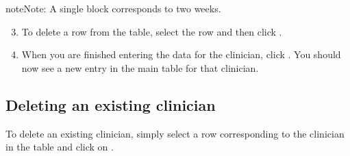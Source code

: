 \documentclass[letterpaper,10pt,english]{sphinxmanual}
\begin{document}
\begin{sphinxadmonition}{note}{Note:}
A single block corresponds to two weeks.
\end{sphinxadmonition}

\begin{figure}[htbp]
\centering
{}\end{figure}

\begin{DUlineblock}{0em}
\item[] 
\end{DUlineblock}
\begin{enumerate}
\setcounter{enumi}{2}
\item {} 
To delete a row from the table, select the row and then click .

\end{enumerate}

\begin{figure}[htbp]
\centering
{}\end{figure}

\begin{DUlineblock}{0em}
\item[] 
\end{DUlineblock}
\begin{enumerate}
\setcounter{enumi}{3}
\item {} 
When you are finished entering the data for the clinician, click .
You should now see a new entry in the main table for that clinician.

\end{enumerate}

\begin{figure}[htbp]
\centering
{}\end{figure}

\begin{DUlineblock}{0em}
\item[] 
\end{DUlineblock}


\subsection{Deleting an existing clinician}
\label{\detokenize{index:deleting-an-existing-clinician}}
To delete an existing clinician, simply select a row corresponding
to the clinician in the table and click on .
\end{document}
